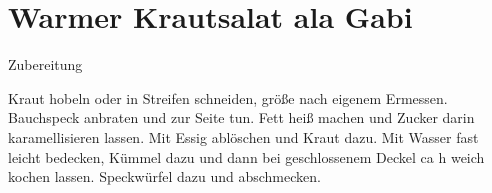 \chapter*{Warmer Krautsalat ala Gabi}

{\Large Zubereitung} \newline
\begin{addmargin}[1cm]{0cm}
	Kraut hobeln oder in Streifen schneiden, größe nach eigenem Ermessen.\newline
	Bauchspeck anbraten und zur Seite tun.\newline
	Fett heiß machen und Zucker darin karamellisieren lassen.\newline
	Mit Essig ablöschen und Kraut dazu.\newline
	Mit Wasser fast leicht bedecken, Kümmel dazu und dann bei geschlossenem Deckel ca h weich kochen
	lassen.\newline
	Speckwürfel dazu und abschmecken.\newline
	
	
	
\end{addmargin}
